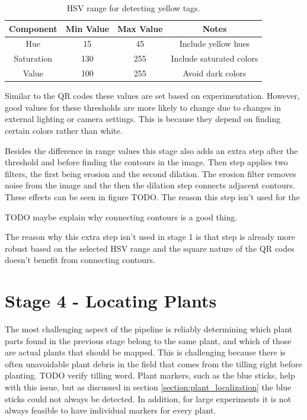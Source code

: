 \begin{table}[hb]
    \begin{center}
    \caption{HSV range for detecting yellow tags.}
    \begin{tabular}[c]{|c|c|c|c|}
        \hline
        Component & Min Value & Max Value & Notes \\
        \hline
        Hue        & 15  & 45  & Include yellow hues       \\
        Saturation & 130 & 255 & Include saturated colors  \\
        Value      & 100 & 255 & Avoid dark colors         \\
        \hline
    \end{tabular}
    \label{table:stick_hsv_ranges}
   \end{center}
\end{table}

Similar to the QR codes these values are set based on experimentation.   However, good values for these thresholds are more likely to change due to changes in external lighting or camera settings.  This is because they depend on finding certain colors rather than white.




Besides the difference in range values this stage also adds an extra step after the threshold and before finding the contours in the image.  Then step applies two filters, the first being erosion and the second dilation.  The erosion filter removes noise from the image and the then the dilation step connects adjacent contours.  These effects can be seen in figure TODO.  The reason this step isn't used for the 

TODO maybe explain why connecting contours is a good thing.

The reason why this extra step isn't used in stage 1 is that step is already more robust based on the selected HSV range and the square nature of the QR codes doesn't benefit from connecting contours.   

\section{Stage 4 - Locating Plants}
\label{processing-stage4}

The most challenging aspect of the pipeline is reliably determining which plant parts found in the previous stage belong to the same plant, and which of those are actual plants that should be mapped.  This is challenging because there is often unavoidable plant debris in the field that comes from the tilling right before planting. TODO verify tilling word.  Plant markers, such as the blue sticks, help with this issue, but as discussed in section \ref{section:plant_localization} the blue sticks could not always be detected.  In addition, for large experiments it is not always feasible to have individual markers for every plant.  

